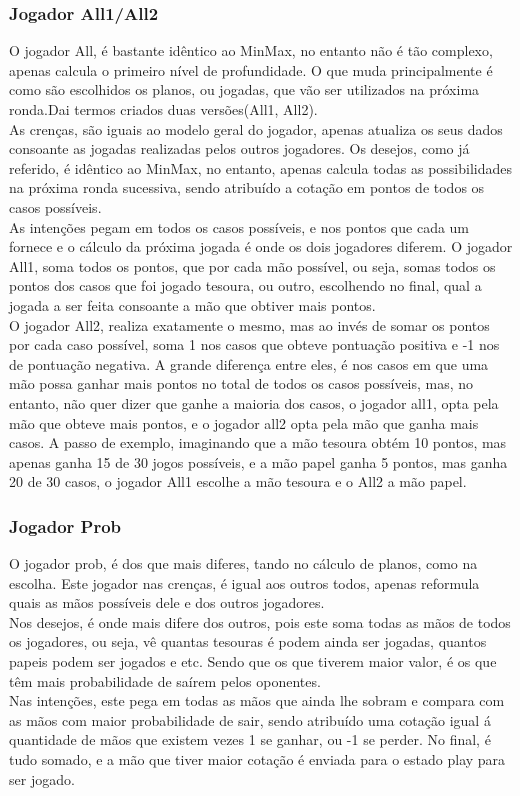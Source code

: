 \documentclass[12pt]{article}
\begin{document}
	\subsubsection*{Jogador All1/All2}
	O jogador All, é bastante idêntico ao MinMax, no entanto não é tão complexo, apenas calcula o primeiro nível de profundidade. O que muda principalmente é como são escolhidos os planos, ou jogadas, que vão ser utilizados na próxima ronda.Dai termos criados duas versões(All1, All2).\\
    As crenças, são iguais ao modelo geral do jogador, apenas atualiza os seus dados consoante as jogadas realizadas pelos outros jogadores.
    Os desejos, como já referido, é idêntico ao MinMax, no entanto, apenas calcula todas as possibilidades na próxima ronda sucessiva, sendo atribuído a cotação em pontos de todos os casos possíveis.\\
    As intenções pegam em todos os casos possíveis, e nos pontos que cada um fornece e o cálculo da próxima jogada é onde os dois jogadores diferem.
    O jogador All1, soma todos os pontos, que por cada mão possível, ou seja, somas todos os pontos dos casos que foi jogado tesoura, ou outro, escolhendo no final, qual a jogada a ser feita consoante a mão que obtiver mais pontos.\\
    O jogador All2, realiza exatamente o mesmo, mas ao invés de somar os pontos por cada caso possível, soma 1 nos casos que obteve pontuação positiva e -1 nos de pontuação negativa.
    A grande diferença entre eles, é nos casos em que uma mão possa ganhar mais pontos no total de todos os casos possíveis, mas, no entanto, não quer dizer que ganhe a maioria dos casos, o jogador all1, opta pela mão que obteve mais pontos, e o jogador all2 opta pela mão que ganha mais casos. A passo de exemplo, imaginando que a mão tesoura obtém 10 pontos, mas apenas ganha 15 de 30 jogos possíveis, e a mão papel ganha 5 pontos, mas ganha 20 de 30 casos, o jogador All1 escolhe a mão tesoura e o All2 a mão papel.\\

	\subsubsection*{Jogador Prob}
	O jogador prob, é dos que mais diferes, tando no cálculo de planos, como na escolha.
    Este jogador nas crenças, é igual aos outros todos, apenas reformula quais as mãos possíveis dele e dos outros jogadores.\\
    Nos desejos, é onde mais difere dos outros, pois este soma todas as mãos de todos os jogadores, ou seja, vê quantas tesouras é podem ainda ser jogadas, quantos papeis podem ser jogados e etc. Sendo que os que tiverem maior valor, é os que têm mais probabilidade de saírem pelos oponentes.\\
    Nas intenções, este pega em todas as mãos que ainda lhe sobram e compara com as mãos com maior probabilidade de sair, sendo atribuído uma cotação igual á quantidade de mãos que existem vezes 1 se ganhar, ou -1 se perder. No final, é tudo somado, e a mão que tiver maior cotação é enviada para o estado play para ser jogado.\\
\end{document}
